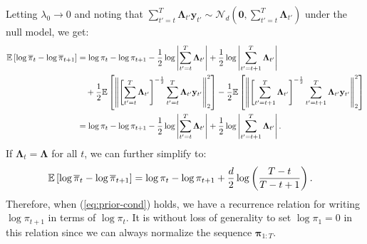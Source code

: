 \normalsize
Letting $\lambda_0 \to 0$ and noting that $\sum_{t'=t}^{T} \boldsymbol{\Lambda}_{t'} \mathbf{y}_{t'} \sim \mathcal{N}_d\left(\mathbf{0}, \sum_{t'=t}^{T} \boldsymbol{\Lambda}_{t'}\right)$ under the null model, we get:
\small
\begin{align*}
    \mathbb{E}\left[\log\overline{\pi}_t - \log \overline{\pi}_{t+1} \right] &= \log \pi_t - \log \pi_{t+1} - \frac{1}{2} \log \left|\sum_{t'=t}^{T} \boldsymbol{\Lambda}_{t'}\right| + \frac{1}{2} \log \left|\sum_{t'=t+1}^{T} \boldsymbol{\Lambda}_{t'}\right|\\
    &\quad + \frac{1}{2} \mathbb{E}\left[\left\lVert \left[ \sum_{t'=t}^{T} \boldsymbol{\Lambda}_{t'}\right]^{-\frac{1}{2}} \sum_{t'=t}^{T} \boldsymbol{\Lambda}_{t'} \mathbf{y}_{t'}\right\rVert_2^2  \right] - \frac{1}{2} \mathbb{E}\left[\left\lVert \left[\sum_{t'=t+1}^{T} \boldsymbol{\Lambda}_{t'}\right]^{-\frac{1}{2}} \sum_{t'=t+1}^{T} \boldsymbol{\Lambda}_{t'} \mathbf{y}_{t'}\right\rVert_2^2  \right]\\
    &= \log \pi_t - \log \pi_{t+1} - \frac{1}{2} \log \left|\sum_{t'=t}^{T} \boldsymbol{\Lambda}_{t'}\right| + \frac{1}{2} \log \left|\sum_{t'=t+1}^{T} \boldsymbol{\Lambda}_{t'}\right|.
\end{align*}
\normalsize
If $\boldsymbol{\Lambda}_t = \boldsymbol{\Lambda}$ for all $t$, we can further simplify to:
\begin{align*}
    \mathbb{E}\left[\log\overline{\pi}_t - \log \overline{\pi}_{t+1} \right] &= \log \pi_t - \log \pi_{t+1} + \frac{d}{2} \log\left(\frac{T-t}{T-t+1}\right).
\end{align*}
Therefore, when (\ref{eq:prior-cond}) holds, we have a recurrence relation for writing $\log \pi_{t+1}$ in terms of $\log \pi_{t}$. It is without loss of generality to set $\log \pi_1 = 0$ in this relation since we can always normalize the sequence $\boldsymbol{\pi}_{1:T}$. 

